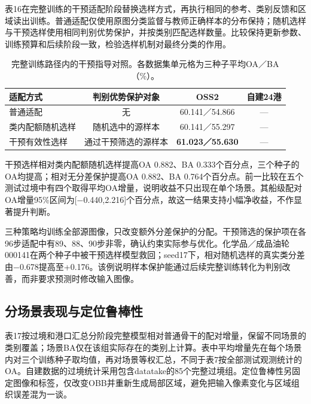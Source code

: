 \documentclass[journal,10pt,a4paper]{IEEEtran}
\begin{document}
表16在完整训练的干预适配阶段替换选样方式，再执行相同的参考、类别反馈和区域读出训练。普通适配仅使用原图分类监督与教师正确样本的分布保持；随机选样与干预选样使用相同判别优势保护，并按类别匹配选样数量。比较保持更新参数、训练预算和后续阶段一致，检验选样机制对最终分类的作用。

\begin{table}[H]
\centering\footnotesize
\setcounter{table}{15}
\caption{完整训练路径内的干预指导对照。各数据集单元格为三种子平均OA／BA（\%）。}
\label{tab:16}
\setlength{\tabcolsep}{3pt}\renewcommand{\arraystretch}{1.2}
\begin{tabularx}{\linewidth}{LCCC}
\toprule
适配方式 & 判别优势保护对象 & OSS2 & 自建24港 \\
\midrule
普通适配 & 无 & 60.141／54.866 & --- \\
类内配额随机选样 & 随机选中的源样本 & 60.141／55.297 & --- \\
干预有效性选样 & 通过干预筛选的源样本 & \textbf{61.023／55.630} & --- \\
\bottomrule
\end{tabularx}
\end{table}

干预选样相对类内配额随机选样提高OA 0.882、BA 0.333个百分点，三个种子的OA均提高；相对无分差保护提高OA 0.882、BA 0.764个百分点。前一比较在五个测试过境中有四个取得平均OA增量，说明收益不只出现在单个场景。其船级配对OA增量95\%区间为{[}−0.440,2.216{]}个百分点，故这一结果支持小幅净收益，不作显著提升判断。

三种策略均训练全部源图像，只改变额外分差保护的分配。干预筛选的保护项在各96步适配中有89、88、90步非零，确认约束实际参与优化。化学品／成品油轮000141在两个种子中被干预选样模型救回；seed17下，相对随机选样的真实类分差由−0.678提高至+0.176。该例说明样本保护能通过后续完整训练转化为判别改善，而非要求预测时修改输入图像。

\subsection{分场景表现与定位鲁棒性}\label{ux5206ux573aux666fux8868ux73b0ux4e0eux5b9aux4f4dux9c81ux68d2ux6027}

表17按过境和港口汇总分阶段完整模型相对普通骨干的配对增量，保留不同场景的类别覆盖；场景BA仅在该组实际存在的类别上计算。表中平均增量先在每个场景内对三个训练种子取均值，再对场景等权汇总，不同于表7按全部测试观测统计的OA。自建数据的过境统计采用包含datatake的85个完整过境组。定位鲁棒性另固定图像和标签，仅改变OBB并重新生成局部区域，避免把输入像素变化与区域组织误差混为一谈。
\end{document}
